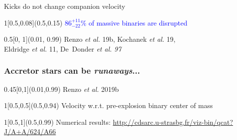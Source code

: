 \documentclass[xcolor=dvipsnames,professionalfonts, aspectratio=169]{beamer}
\begin{document}
\begin{frame}{Kicks do not change companion velocity}
  \begin{textblock}{1}[0.5,0.08](0.5,0.15)
    \centering\Large \textcolor{Blue}{{\Huge $86^{+11}_{-22}\%$} of massive binaries are
      disrupted}
  \end{textblock}

  \begin{textblock}{0.5}[0, 1](0.01, 0.99)
    \textcolor{gray!50}{\tiny Renzo \emph{et al.} 19b, Kochanek
      \emph{et al.} 19,\\[-7pt]
      Eldridge \emph{et al.} 11,
    De~Donder \emph{et al. 97}}
\end{textblock}
\end{frame}



\begin{frame}
  \frametitle{Accretor stars can be \emph{runaways}...}
  \centering

  \begin{textblock}{0.45}[0,1](0.01,0.99)
    \textcolor{gray!50}{\tiny Renzo \emph{et al.} 2019b}\hfill\,
  \end{textblock}

  \begin{textblock}{1}[0.5,0.5](0.5,0.94)
    \textcolor{gray!50}{Velocity w.r.t. pre-explosion binary center of mass}
  \end{textblock}

  \begin{textblock}{1}[0.5,1](0.5,0.99)
    \centering
    \textcolor{gray!50}{\tiny Numerical results:   \href{http://cdsarc.u-strasbg.fr/viz-bin/qcat?J/A+A/624/A66}{http://cdsarc.u-strasbg.fr/viz-bin/qcat?J/A+A/624/A66}}
  \end{textblock}
\end{frame}
\end{document}
